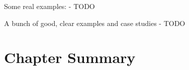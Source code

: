 Some real examples:
- TODO

A bunch of good, clear examples and case studies
- TODO

\section{Chapter Summary}